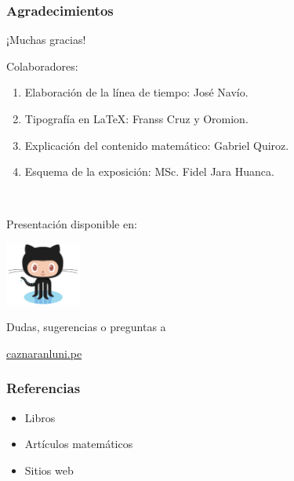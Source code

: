 \documentclass[spanish, utf8,handout]{beamer} %
\theoremstyle{definition}
\begin{document}
\begin{frame}
\frametitle{Agradecimientos}

\begin{center}\Large
	¡Muchas gracias!
\end{center}

Colaboradores:

\begin{enumerate}
	\item Elaboración de la línea de tiempo: José Navío.
	\item Tipografía en \LaTeX{}: Franss Cruz y Oromion.
	\item Explicación del contenido matemático: Gabriel Quiroz.
	\item Esquema de la exposición: MSc. Fidel Jara Huanca.
\end{enumerate}

\

{
\color{DarkBlue}
Presentación disponible en:
}
\begin{center}
\href{https://github.com/carlosal1015/4colores}{\includegraphics[width=2.5cm]{Octocat.png}}
\end{center}
\hfill
\begin{flushright}
Dudas, sugerencias o preguntas a

\href{mailto:caznaranl@uni.pe}{caznaranl\MVAt uni.pe}
\end{flushright}
\end{frame}

\begin{frame}[allowframebreaks]\transblindsvertical
\frametitle{Referencias}

\begin{itemize}
	\item Libros
	\nocite{*}
	\printbibliography[heading=none,keyword=book]
	
	\item Artículos matemáticos
	\printbibliography[heading=none,keyword=paper]
	
	\item Sitios web
	\printbibliography[heading=none,keyword=online]
\end{itemize}
\end{frame}
\end{document}
